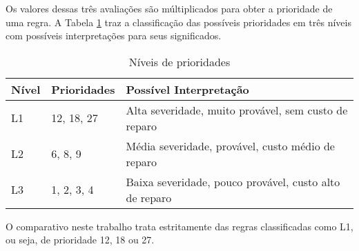 Os valores dessas três avaliações são múltiplicados para obter a prioridade de uma regra. A Tabela \ref{table:prioriades} traz a classificação das possíveis prioridades em três níveis com possíveis interpretações para seus significados.

\begin{table}[!h]
  \begin{tabular}{l|l|l}
    Nível & Prioridades & Possível Interpretação \\\hline
    L1 & 12, 18, 27 & Alta severidade, muito provável, sem custo de reparo\\
    L2 & 6, 8, 9 & Média severidade, provável, custo médio de reparo\\
    L3 & 1, 2, 3, 4 & Baixa severidade, pouco provável, custo alto de reparo\\
  \end{tabular}
  \caption{Níveis de prioridades}
  \label{table:prioriades}
\end{table}

O comparativo neste trabalho trata estritamente das regras classificadas como L1, ou seja, de prioridade 12, 18 ou 27.
